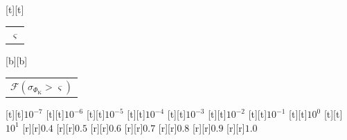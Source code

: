 %    
%
%
\begin{psfrags}%
\psfragscanon%
%
[t][t]{\color[rgb]{0,0,0}\setlength{\tabcolsep}{0pt}\begin{tabular}{c}{\Large$\varsigma$}\end{tabular}}%
[b][b]{\color[rgb]{0,0,0}\setlength{\tabcolsep}{0pt}\begin{tabular}{c}{\Large$\mathcal{F}(\sigma_{\Phi_\mathrm{K}} > \varsigma)$}\end{tabular}}%
%
[t][t]{$10^{-7}$}%
[t][t]{$10^{-6}$}%
[t][t]{$10^{-5}$}%
[t][t]{$10^{-4}$}%
[t][t]{$10^{-3}$}%
[t][t]{$10^{-2}$}%
[t][t]{$10^{-1}$}%
[t][t]{$10^{0}$}%
[t][t]{$10^{1}$}%
%
[r][r]{$0.4$}%
[r][r]{$0.5$}%
[r][r]{$0.6$}%
[r][r]{$0.7$}%
[r][r]{$0.8$}%
[r][r]{$0.9$}%
[r][r]{$1.0$}%
%
%
\end{psfrags}%
%
